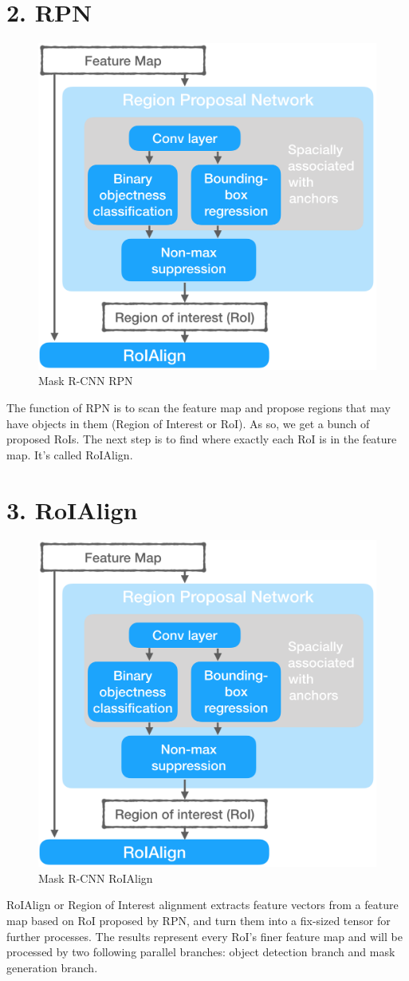 \documentclass[a4paper]{report}
\begin{document}
\section*{2. RPN}
\begin{figure}[h]
    \centering
    \includegraphics[width=0.4 \textwidth]{./entities/maskrcnn-rpn.png}
    \caption{Mask R-CNN RPN}
    \label{fig:RCNN_RPN}
\end{figure}
The function of RPN is to scan the feature map and propose regions that may have objects in them (Region of Interest or RoI). As so, we get a bunch of proposed RoIs. The next step is to find where exactly each RoI is in the feature map. It's called RoIAlign.

\section*{3. RoIAlign}
\begin{figure}[h]
    \centering
    \includegraphics[width=0.4 \textwidth]{./entities/maskrcnn-rpn.png}
    \caption{Mask R-CNN RoIAlign}
    \label{fig:RCNN_RoIAlign}
\end{figure}
RoIAlign or Region of Interest alignment extracts feature vectors from a feature map based on RoI proposed by RPN, and turn them into a fix-sized tensor for further processes. The results represent every RoI's finer feature map and will be processed by two following parallel branches: object detection branch and mask generation branch.
\end{document}
